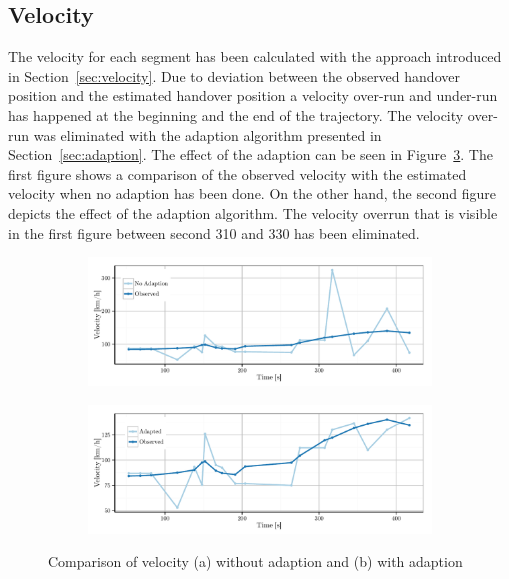 \subsection{Velocity}
The velocity for each segment has been calculated with the approach introduced in Section~\ref{sec:velocity}. Due to deviation between the observed handover position and the estimated handover position a velocity over-run and under-run has happened at the beginning and the end of the trajectory. The velocity over-run was eliminated with the adaption algorithm presented in Section~\ref{sec:adaption}. The effect of the adaption can be seen in Figure~\ref{fig:563velocity}. The first figure shows a comparison of the observed velocity with the estimated velocity when no adaption has been done. On the other hand, the second figure depicts the effect of the adaption algorithm. The velocity overrun that is visible in the first figure between second 310 and 330 has been eliminated.
\begin{figure}
	\centering
	\begin{subfigure}[b]{\textwidth}
		\includegraphics[width=\textwidth]{./images/563_velocityNoAdapt}
		\caption{}
		\label{fig:disthandover}
	\end{subfigure}%
	
	\begin{subfigure}[b]{\textwidth}
		\includegraphics[width=\textwidth]{./images/563_velocityAdapt}
		\caption{}
		\label{fig:distmoc}
	\end{subfigure}
	\caption{Comparison of velocity (a) without adaption  and (b) with adaption}\label{fig:563velocity}
\end{figure}


